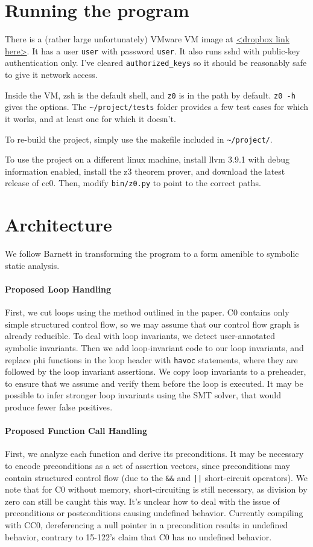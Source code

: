 \documentclass[12pt]{article}
\begin{document}
\section{Running the program}
There is a (rather large unfortunately) VMware VM image at \url{<dropbox link here>}. It has a user \texttt{user} with password \texttt{user}. It also runs sshd with public-key authentication only. I've cleared \verb|authorized_keys| so it should be reasonably safe to give it network access.

Inside the VM, zsh is the default shell, and \texttt{z0} is in the path by default. \texttt{z0 -h} gives the options. The \verb|~/project/tests| folder provides a few test cases for which it works, and at least one for which it doesn't.

To re-build the project, simply use the makefile included in \verb|~/project/|.

To use the project on a different linux machine, install llvm 3.9.1 with debug information enabled, install the z3 theorem prover, and download the latest release of cc0. Then, modify \texttt{bin/z0.py} to point to the correct paths.

\section{Architecture}
We follow Barnett \cite{Barnett:2005:WUP:1108768.1108813} in transforming the program to a form amenible to symbolic static analysis.

\paragraph{Proposed Loop Handling}
First, we cut loops using the method outlined in the paper. C0 contains only simple structured control flow, so we may assume that our control flow graph is already reducible.
To deal with loop invariants, we detect user-annotated symbolic invariants. Then we add loop-invariant code to our loop invariants, and replace phi functions in the loop header with \texttt{havoc} statements, where they are followed by the loop invariant assertions. We copy loop invariants to a preheader, to ensure that we assume and verify them before the loop is executed. It may be possible to infer stronger loop invariants using the SMT solver, that would produce fewer false positives.

\paragraph{Proposed Function Call Handling}
First, we analyze each function and derive its preconditions.
It may be necessary to encode preconditions as a set of assertion vectors, since preconditions may contain structured control flow (due to the \texttt{\&\&} and \texttt{||} short-circuit operators). We note that for C0 without memory, short-circuiting is still necessary, as division by zero can still be caught this way. It's unclear how to deal with the issue of preconditions or postconditions causing undefined behavior. Currently compiling with CC0, dereferencing a null pointer in a precondition results in undefined behavior, contrary to 15-122's claim that C0 has no undefined behavior.
\end{document}
